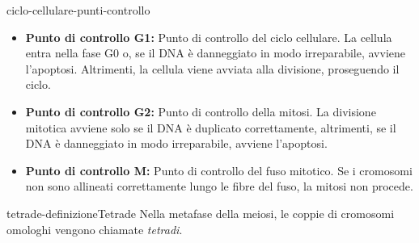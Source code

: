 \documentclass[preview]{standalone}
\begin{document}
\begin{snippet}{ciclo-cellulare-punti-controllo}
    \begin{itemize}
        \item \textbf{Punto di controllo G1:}
            Punto di controllo del ciclo cellulare. La cellula entra nella fase G0 o, se il DNA è danneggiato
            in modo irreparabile, avviene l'apoptosi. Altrimenti, la cellula viene avviata alla divisione,
            proseguendo il ciclo.
        \item \textbf{Punto di controllo G2:}
            Punto di controllo della mitosi. La divisione mitotica avviene solo se il DNA è duplicato
            correttamente, altrimenti, se il DNA è danneggiato in modo irreparabile, avviene l'apoptosi.
        \item \textbf{Punto di controllo M:}
            Punto di controllo del fuso mitotico. Se i cromosomi non sono allineati correttamente lungo
            le fibre del fuso, la mitosi non procede.
    \end{itemize}
\end{snippet}

\begin{snippetdefinition}{tetrade-definizione}{Tetrade}
    Nella metafase della meiosi, le coppie di cromosomi omologhi vengono chiamate
    \textit{tetradi}.
\end{snippetdefinition}


\end{document}

